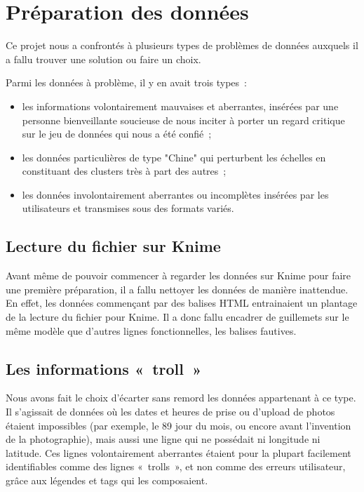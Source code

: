 \chapter{Préparation des données}

Ce projet nous a confrontés à plusieurs types de problèmes de données auxquels il a fallu trouver une solution ou faire un choix.

Parmi les données à problème, il y en avait trois types~:
\begin{itemize}
    \item les informations volontairement mauvaises et aberrantes, insérées par une personne bienveillante soucieuse de nous inciter à porter un regard critique sur le jeu de données qui nous a été confié~;
    \item les données particulières de type "Chine" qui perturbent les échelles en constituant des clusters très à part des autres~;
    \item les données involontairement aberrantes ou incomplètes insérées par les utilisateurs et transmises sous des formats variés.
\end{itemize}

\section{Lecture du fichier sur Knime}
Avant même de pouvoir commencer à regarder les données sur Knime pour faire une première préparation, il a fallu nettoyer les données de manière inattendue. En effet, les données commençant par des balises HTML entrainaient un plantage de la lecture du fichier pour Knime. Il a donc fallu encadrer de guillemets sur le même modèle que d'autres lignes fonctionnelles, les balises fautives.

\section{Les informations «~troll~»}
Nous avons fait le choix d'écarter sans remord les données appartenant à ce type.
Il s'agissait de données où les dates et heures de prise ou d'upload de photos étaient impossibles (par exemple, le 89 jour du mois, ou encore avant l'invention de la photographie), mais aussi une ligne qui ne possédait ni longitude ni latitude.
Ces lignes volontairement aberrantes étaient pour la plupart facilement identifiables comme des lignes «~trolls~», et non comme des erreurs utilisateur, grâce aux légendes et tags qui les composaient.

